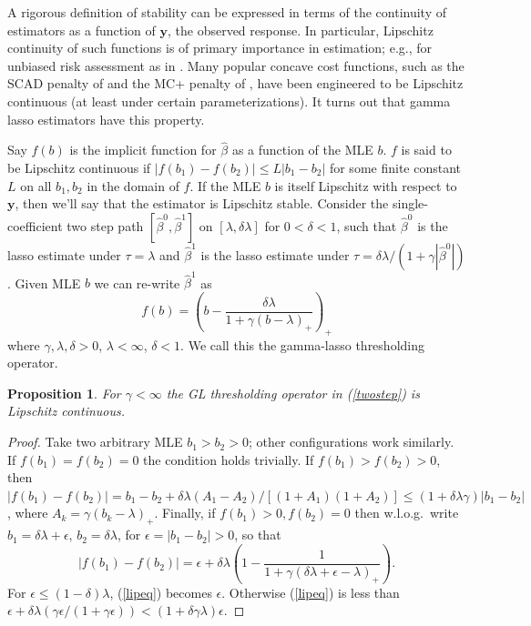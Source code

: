 \documentclass[12pt]{article}
\newtheorem{prop}{\sc Proposition}[section]
\newcommand{\bm}[1]{\mathbf{#1}}
\begin{document}
A rigorous definition of stability can be expressed in terms of the continuity
of  estimators as a function of $\bm{y}$, the observed response.  In
particular, Lipschitz continuity of such functions is of primary importance in
estimation; e.g., for unbiased risk assessment as in
\cite{stein_estimation_1981}.  Many popular concave cost functions, such as
the SCAD penalty of \cite{fan_variable_2001} and the MC+ penalty of
\citet{zhang_nearly_2010}, have been engineered to be Lipschitz continuous (at
least under certain parameterizations).  It turns out that gamma lasso
estimators have this property.

Say $f(b)$ is the implicit function for $\hat\beta$ as a function of the MLE
$b$.  $f$ is said to be Lipschitz continuous if  $ |f(b_1)-f(b_2)| \leq
L|b_1-b_2| $ for some finite constant $L$ on all $b_1,b_2$ in the domain of
$f$. If the MLE $b$ is itself Lipschitz with respect to $\bm{y}$, then we'll
say that the estimator is Lipschitz stable.    Consider the single-coefficient
two step path $[\hat\beta^0,\hat\beta^1]$ on $[\lambda,\delta\lambda]$ for
$0<\delta<1$, such that $\hat\beta^0$ is the lasso estimate under $\tau =
\lambda$ and $\hat\beta^1$ is the lasso estimate under $\tau =
\delta\lambda/(1+\gamma|\hat\beta^0|)$. Given MLE $b$ we can re-write
$\hat\beta^1$ as \begin{equation}\label{twostep} f(b) = \left(b -
\frac{\delta\lambda}{1+\gamma(b-\lambda)_+}\right)_+  \end{equation} where
$\gamma,\lambda,\delta >0$, $\lambda < \infty$, $\delta<1$.  We call this the
gamma-lasso thresholding operator.

\begin{prop} For $\gamma<\infty$ the GL thresholding  operator in
(\ref{twostep}) is Lipschitz continuous. \end{prop} \begin{proof} Take two
arbitrary MLE $b_1 > b_2 >0$;  other configurations work similarly.   If
$f(b_1) = f(b_2) =0$ the condition holds trivially.   If $f(b_1) > f(b_2) >
0$, then  $|f(b_1) - f(b_2)| = b_1 - b_2 + \delta\lambda (A_1 -
A_2)/[(1+A_1)(1+A_2)] \leq (1+\delta\lambda \gamma)|b_1-b_2|$, where $A_k =
\gamma(b_k-\lambda)_{+}$. Finally, if $f(b_1)>0, f(b_2)=0$ then w.l.o.g.~write $b_1 = \delta\lambda + \epsilon$, $b_2 = \delta\lambda$, for $\epsilon  = |b_1-b_2| > 0$, so
that 
\begin{equation}\label{lipeq}
 |f(b_1) - f(b_2)| =\epsilon  
 + \delta\lambda\left(1 - \frac{1}
 {1 + \gamma(\delta\lambda + \epsilon - \lambda)_+}\right).
 \end{equation} 
For $\epsilon \leq (1-\delta)\lambda$, (\ref{lipeq}) becomes $ \epsilon$.  Otherwise (\ref{lipeq}) is 
less than $\epsilon + \delta\lambda
\left(\gamma\epsilon/(1+\gamma\epsilon)\right) < (1+\delta\gamma\lambda)\epsilon$.
\end{proof}
\end{document}
